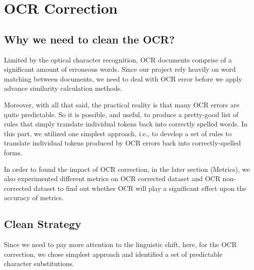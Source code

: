 \section{OCR Correction}
\subsection{Why we need to clean the OCR?}

Limited by the optical character recognition, OCR documents comprise of a significant amount of erroneous words. Since our project rely heavily on word matching between documents, we need to deal with OCR error before we apply advance similarity calculation methods. 

Moreover, with all that said, the practical reality is that many OCR errors are quite predictable. So it is possible, and useful, to produce a pretty-good list of rules that simply translate individual tokens back into correctly spelled words. In this part, we utilized one simplest approach, i.e., to develop a set of rules to translate individual tokens produced by OCR errors back into correctly-spelled forms.

In order to found the impact of OCR correction, in the later section (Metrics), we also experimented different metrics on OCR corrected dataset and OCR non-corrected dataset to find out whether OCR will play a significant effect upon the accuracy of metrics.

\subsection{Clean Strategy}
Since we need to pay more attention to the linguistic shift, here, for the OCR correction, we chose simplest approach and identified a set of predictable character substitutions. 

